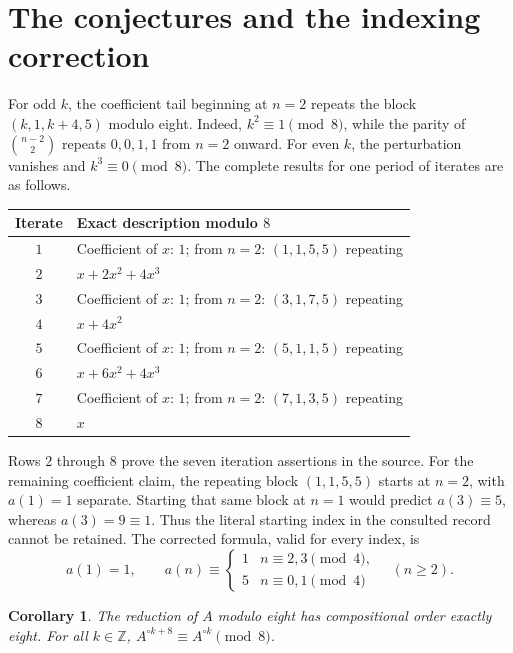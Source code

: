 \documentclass[11pt]{article}
\newtheorem{corollary}[theorem]{Corollary}
\theoremstyle{remark}
\newcommand{\Z}{\mathbb Z}
\newcommand{\itn}[2]{{#1}^{\circ #2}}
\begin{document}
\section{The conjectures and the indexing correction}\label{sec:consequences}

For odd $k$, the coefficient tail beginning at $n=2$ repeats the block
$(k,1,k+4,5)$ modulo eight. Indeed, $k^2\equiv1\pmod8$, while the
parity of $\binom{n-2}{2}$ repeats $0,0,1,1$ from $n=2$ onward.
For even $k$, the perturbation vanishes and $k^3\equiv0\pmod8$.
The complete results for one period of iterates are as follows.

\begin{center}
\renewcommand{\arraystretch}{1.15}
\begin{tabular}{@{}cl@{}}
\toprule
Iterate & Exact description modulo $8$\\
\midrule
$1$ & Coefficient of $x$: $1$; from $n=2$: $(1,1,5,5)$ repeating\\
$2$ & $x+2x^2+4x^3$\\
$3$ & Coefficient of $x$: $1$; from $n=2$: $(3,1,7,5)$ repeating\\
$4$ & $x+4x^2$\\
$5$ & Coefficient of $x$: $1$; from $n=2$: $(5,1,1,5)$ repeating\\
$6$ & $x+6x^2+4x^3$\\
$7$ & Coefficient of $x$: $1$; from $n=2$: $(7,1,3,5)$ repeating\\
$8$ & $x$\\
\bottomrule
\end{tabular}
\end{center}

Rows $2$ through $8$ prove the seven iteration assertions in the source.
For the remaining coefficient claim, the repeating block $(1,1,5,5)$
starts at $n=2$, with $a(1)=1$ separate. Starting that same block at
$n=1$ would predict $a(3)\equiv5$, whereas $a(3)=9\equiv1$.
Thus the literal starting index in the consulted record cannot be retained.
The corrected formula, valid for every index, is
\[
a(1)=1,\qquad
a(n)\equiv
\begin{cases}
1 & n\equiv2,3\pmod4,\\
5 & n\equiv0,1\pmod4
\end{cases}
\quad(n\geq2).
\]

\begin{corollary}
The reduction of $A$ modulo eight has compositional order exactly eight.
For all $k\in\Z$, $\itn{A}{k+8}\equiv\itn{A}{k}\pmod8$.
\end{corollary}
\end{document}
